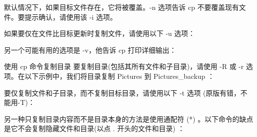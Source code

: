 \documentclass[letterpaper,12pt,english]{sphinxmanual}
\begin{document}
默认情况下，如果目标文件存在，它将被覆盖。-n 选项告诉 cp 不要覆盖现有文件。要提示确认，请使用该 -i 选项。

\begin{sphinxVerbatim}[commandchars=\\\{\}]
   
\end{sphinxVerbatim}

如果要仅在文件比目标更新时复制文件，请使用以下 -u 选项：

\begin{sphinxVerbatim}[commandchars=\\\{\}]
   
\end{sphinxVerbatim}

另一个可能有用的选项是 -v，他告诉 cp 打印详细输出：

\begin{sphinxVerbatim}[commandchars=\\\{\}]
   
  
\end{sphinxVerbatim}

使用 cp 命令复制目录
要复制目录(包括其所有文件和子目录)，请使用 -R 或 -r 选项。在以下示例中，我们将目录复制 Pictures 到 Pictures\_backup ：

\begin{sphinxVerbatim}[commandchars=\\\{\}]
   
\end{sphinxVerbatim}

要仅复制文件和子目录，而不复制目标目录，请使用以下 -t 选项 (原版有错，不能用-T)：

\begin{sphinxVerbatim}[commandchars=\\\{\}]
   
\end{sphinxVerbatim}

另一种只复制目录内容而不是目录本身的方法是使用通配符 (*) 。以下命令的缺点是它不会复制隐藏文件和目录(以点 . 开头的文件和目录) ：
\end{document}

